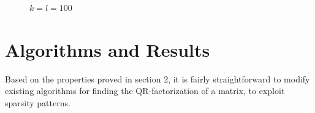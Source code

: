 \documentclass{article}
\numberwithin{pic}{section}
\numberwithin{lem}{section}
\numberwithin{thm}{section}
\numberwithin{cor}{section}
\theoremstyle{definition}
\numberwithin{ex}{section}
\numberwithin{defn}{section}
\theoremstyle{definition}
\theoremstyle{remark}
\newlength\tindent
\renewcommand{\indent}{\hspace*{\tindent}}
\begin{document}
\begin{figure}[H] 

    \caption{$k=l=100$ }
\end{figure} 
\section{Algorithms and Results}
\indent Based on the properties proved in section 2, it is fairly straightforward
to modify existing algorithms for finding the QR-factorization of a matrix, to
exploit sparsity patterns.
\end{document}
